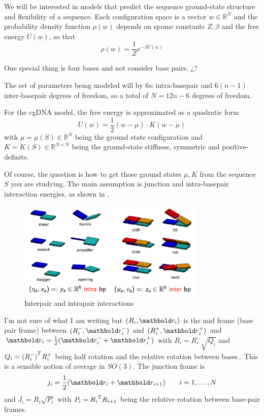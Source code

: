 \documentclass[palatino]{epflnotes}
\begin{document}
We will be interested in models that predict the sequence ground-state structure and flexibility of a sequence. Each configuration space is a vector $w ∈ ℝ^N$ and the probability density function $ρ(w)$ depends on spome constants $Z,β$ and the free energy $U(w)$, so that \[ ρ(w) = \frac{1}{Z} e^{-βU(w)} \]

One special thing is four bases and not consider base pairs. ¿?

The set of parameters being modeled will by $6n$ intra-basepair and $6(n-1)$ inter-basepair degrees of freedom, so a total of $N = 12n - 6$ degrees of freedom.

For the cgDNA model, the free energy is approximated as a quadratic form \[ U(w)= \frac{1}{2} (w - μ) · K(w -μ)\] with $μ = μ(S) ∈ ℝ^N$ being the ground state configuration and $K = K(S) ∈ ℝ^{N×N}$ being the ground-state stiffness, symmetric and positive-definite.

Of course, the question is how to get those ground states $μ, K$ from the sequence $S$ you are studying. The main assumption is junction and intra-basepair interaction energies, as shown in .

\begin{figure}[tbp]
\centering
\includegraphics[width=0.8\textwidth]{img/movementsDNA.png}
\caption{Interpair and intrapair interactions}
\label{fig:MovementsDNA}
\end{figure}


I'm not sure of what I am writing but $(R_i, \vr_i)$ is the mid frame (base pair frame) between $(R_i^-, \vr_i^-)$ and $(R_i^+, \vr_i^+)$ and $\vr_i = \frac{1}{2} (\vr_i^- + \vr_i^+)$ with $R_i = R_i^-\sqrt{Q_i}$ and $Q_i = {(R_i^{-})}^{T} R_i^+$ being half rotation and the relative rotation between bases.. This is a sensible notion of average in $SO(3)$. The junction frame is \[ j_i = \frac{1}{2}(\vr_i + \vr_{i+1}) \qquad i = 1, \dotsc, N\] and $J_i = R_i \sqrt{P_i}$ with $P_i = {R_i}^{T} R_{i+1}$ being the relative rotation between base-pair frames.
\end{document}
